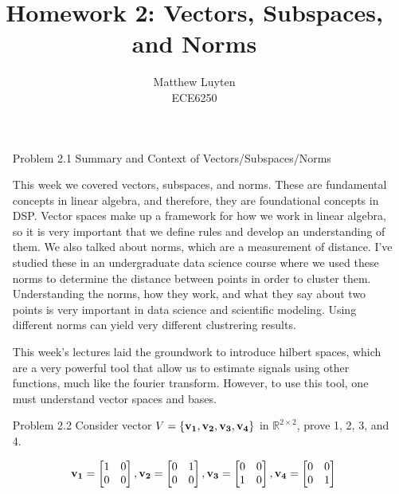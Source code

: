 \documentclass[12pt]{article}
\begin{document}
 
\title{Homework 2: Vectors, Subspaces, and Norms}
\author{Matthew Luyten\\ %
ECE6250}

\maketitle

\begin{enumerate}
\item[Problem 2.1] Summary and Context of Vectors/Subspaces/Norms

This week we covered vectors, subspaces, and norms. These are fundamental concepts in linear algebra,
and therefore, they are foundational concepts in DSP. Vector spaces make up a framework for how we
work in linear algebra, so it is very important that we define rules and develop an understanding
of them. We also talked about norms, which are a measurement of distance. I've studied these in an
undergraduate data science course where we used these norms to determine the distance between points
in order to cluster them. Understanding the norms, how they work, and what they say about two points
is very important in data science and scientific modeling. Using different norms can yield very
different clustrering results.

This week's lectures laid the groundwork to introduce hilbert spaces, which are a very powerful tool
that allow us to estimate signals using other functions, much like the fourier transform. However, to use
this tool, one must understand vector spaces and bases.

\newpage

\item[Problem 2.2] Consider vector $V=\{\bold{v_1},\bold{v_2}, \bold{v_3}, \bold{v_4}\}$ in $\mathbb{R}^{2\times2}$, prove 1, 2, 3, and 4.

\[
\bold{v_1}=
\begin{bmatrix}
    1 & 0\\
    0 & 0
\end{bmatrix}
, \bold{v_2}=
\begin{bmatrix}
    0 & 1\\
    0 & 0
\end{bmatrix}
, \bold{v_3}=
\begin{bmatrix}
    0 & 0\\
    1 & 0
\end{bmatrix}
, \bold{v_4}=
\begin{bmatrix}
    0 & 0\\
    0 & 1
\end{bmatrix}
\]


\end{enumerate}
\end{document}
